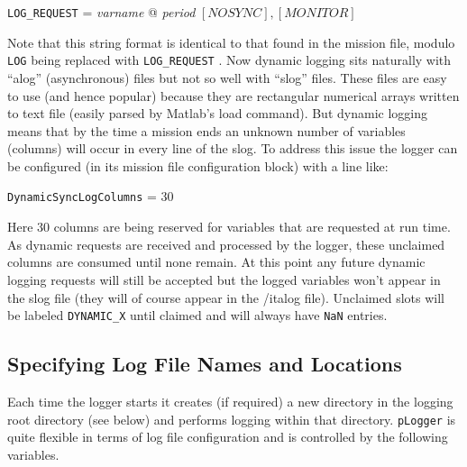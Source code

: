 \documentclass[a4paper,10pt]{article}
\newcommand{\Code}[1]{\texttt{#1} }
\newcommand{\code}[1]{\Code{#1} }
\begin{document}
\begin{center}
\code{LOG\_REQUEST} =  {\it{varname}} @ {\it{period}} $[NOSYNC],[MONITOR]$
\end{center}

Note that this string format is identical to that found in the mission file, modulo \code{LOG} being replaced with \code{LOG\_REQUEST}. Now dynamic logging sits naturally with ``alog'' (asynchronous) files but not so well with ``slog'' files. These files are easy to use (and hence popular)  because they are rectangular numerical arrays written to text file (easily parsed by Matlab's load command). But dynamic logging means that by the time a mission ends an unknown number of variables (columns) will occur in every line of the slog. To address this issue the logger can be configured (in its mission file configuration block) with a line like:

\begin{center}
\code{DynamicSyncLogColumns} =  30
\end{center}

Here 30 columns are being reserved for variables that are requested at run time. As dynamic requests are received and processed by the logger, these unclaimed columns are consumed until none remain. At this point any future dynamic logging requests will still be accepted but the logged variables won't appear in the slog file (they will of course appear in the {/it{alog}} file). Unclaimed slots will be labeled \code{DYNAMIC\_X} until claimed and will always have \code{NaN} entries.

\subsection{Specifying Log File Names and Locations}\label{Sec:Places}

Each time the logger starts it creates (if required) a new directory in the logging root directory (see below) and performs logging within that directory. \code{pLogger} is quite flexible in terms of log file configuration and is controlled by the following variables.
\end{document}
